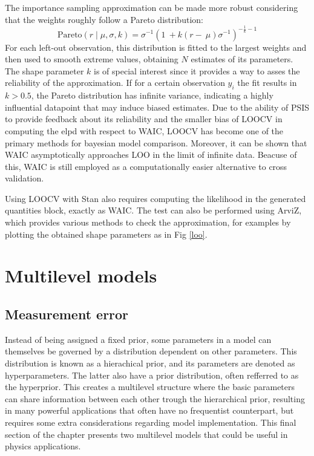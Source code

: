 The importance sampling approximation can be made more robust considering that the weights roughly follow a Pareto distribution:
\begin{equation}
  \text{Pareto}(r\mid\mu,\sigma,k)=\sigma^{-1}\left(1\ +k(r-\ \mu)\sigma^{-1}\right)^{-\frac{1}{k}-1}
\end{equation}
For each left-out observation, this distribution is fitted to the largest weights and then used to smooth extreme
values, obtaining $N$ estimates of its parameters. The shape parameter $k$ is of special interest since it provides a way to asses the reliability of the approximation. If for a certain observation $y_i$ the fit results in  $k>0.5$, the Pareto distribution has infinite variance, indicating a highly influential datapoint that may induce biased estimates.
Due to the ability of PSIS to provide feedback about its reliability and the smaller bias of LOOCV in computing the elpd with respect to WAIC,
LOOCV has become one of the primary methods for bayesian model comparison. Moreover, it can be shown that WAIC asymptotically
approaches LOO in the limit of infinite data. Beacuse of this, WAIC is still employed as a computationally easier
alternative to cross validation.

Using LOOCV with Stan also requires computing the likelihood in the generated quantities block, exactly as WAIC. The
test can also be performed using ArviZ, which provides various methods to check the approximation, for examples by
plotting the obtained shape parameters as in Fig \ref{loo}.


\section{Multilevel models}


\subsection{Measurement error}
Instead of being assigned a fixed prior, some parameters in a model can themselves be governed by a distribution dependent on other parameters. This distribution is known as a hierachical prior, and its parameters are denoted as hyperparameters. The latter also have a prior distribution, often refferred to as the hyperprior. This creates a
multilevel structure where the basic parameters can share information between each other trough the hierarchical prior,
resulting in many powerful applications that often have no frequentist counterpart, but requires some extra
considerations regarding model implementation. This final section of the chapter presents two multilevel models that could be useful
in physics applications.


